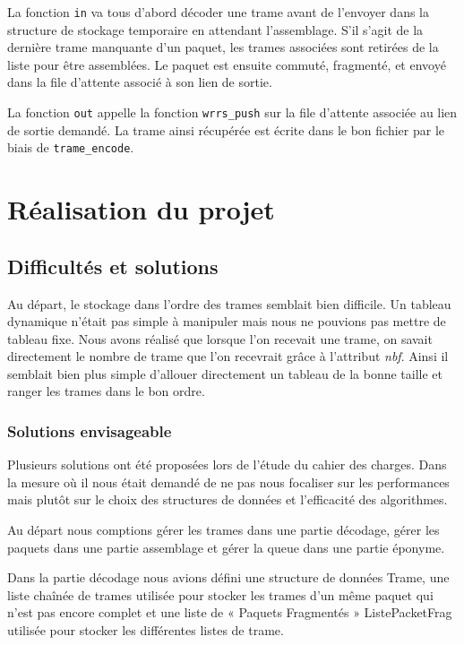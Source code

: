 \documentclass[a4paper,11pt]{article}
\begin{document}
La fonction \texttt{in} va tous d'abord décoder une trame avant de
l'envoyer dans la structure de stockage temporaire en attendant
l'assemblage. S'il s'agit de la dernière trame manquante d'un paquet,
les trames associées sont retirées de la liste pour être assemblées. Le
paquet est ensuite commuté, fragmenté, et envoyé dans la file d'attente
associé à son lien de sortie.

La fonction \texttt{out} appelle la fonction \texttt{wrrs\_push} sur la
file d'attente associée au lien de sortie demandé. La trame ainsi
récupérée est écrite dans le bon fichier par le biais de 
\texttt{trame\_encode}.



\section{Réalisation du projet}

\subsection{Difficultés et solutions}

Au départ, le stockage dans l'ordre des trames semblait bien difficile. Un tableau dynamique n'était pas simple à manipuler mais nous ne pouvions pas mettre de tableau fixe. Nous avons réalisé que lorsque l'on recevait une trame, on savait directement le nombre de trame que l'on recevrait grâce à l'attribut \textit{nbf}. Ainsi il semblait bien plus simple d'allouer directement un tableau de la bonne taille et ranger les trames dans le bon ordre.

\subsubsection{Solutions envisageable}

Plusieurs solutions ont été proposées lors de l'étude du cahier des charges. Dans la mesure où il nous était demandé de ne pas nous focaliser sur les performances mais plutôt sur le choix des structures de données et l'efficacité des algorithmes.

Au départ nous comptions gérer les trames dans une partie décodage, gérer les paquets dans une partie assemblage et gérer la queue dans une partie éponyme.
 
Dans la partie décodage nous avions défini une structure de données Trame, une liste chaînée de trames utilisée pour stocker les trames d'un même paquet qui n'est pas encore complet et une liste de « Paquets Fragmentés » ListePacketFrag utilisée pour stocker les différentes listes de trame.
\end{document}
